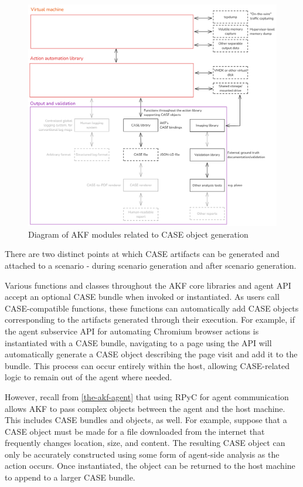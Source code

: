 \documentclass[letterpaper,12pt]{report}
\begin{document}
\begin{figure}[h]
\centering
\includegraphics[width=1\linewidth]{output-and-validation-b.png}
\caption{Diagram of AKF modules related to CASE object
generation}\label{fig:output-b}
\end{figure}

There are two distinct points at which CASE artifacts can be generated
and attached to a scenario - during scenario generation and after
scenario generation.

Various functions and classes throughout the AKF core libraries and
agent API accept an optional CASE bundle when invoked or instantiated.
As users call CASE-compatible functions, these functions can
automatically add CASE objects corresponding to the artifacts generated
through their execution. For example, if the agent subservice API for
automating Chromium browser actions is instantiated with a CASE bundle,
navigating to a page using the API will automatically generate a CASE
object describing the page visit and add it to the bundle. This process
can occur entirely within the host, allowing CASE-related logic to
remain out of the agent where needed.

However, recall from \autoref{the-akf-agent} that using RPyC for agent communication allows AKF to pass
complex objects between the agent and the host machine. This includes
CASE bundles and objects, as well. For example, suppose that a CASE
object must be made for a file downloaded from the internet that
frequently changes location, size, and content. The resulting CASE
object can only be accurately constructed using some form of agent-side
analysis as the action occurs. Once instantiated, the object can be
returned to the host machine to append to a larger CASE bundle.
\end{document}
